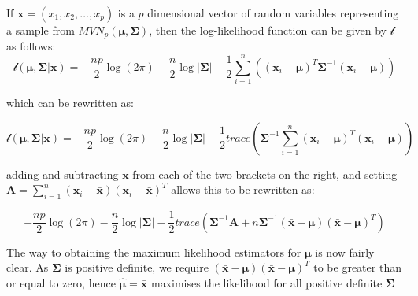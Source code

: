 \begin{theorem}
\label{th:mvnlike}

If $\boldsymbol{x} = (x_{1}, x_{2}, \ldots, x_{p})$ is a $p$ dimensional vector of random variables representing a sample from $MVN_{p}(\boldsymbol{\mu}, \boldsymbol{\Sigma})$, then the log-likelihood function can be given by $\mathscr{l}$ as follows:
\begin{equation}
\label{eq:mvnlike}
\mathscr{l}(\boldsymbol{\mu}, \boldsymbol{\Sigma}| \boldsymbol{x}) = 
- \frac{np}{2} \log(2 \pi) - \frac{n}{2} \log \lvert \boldsymbol{\Sigma} \rvert -
\frac{1}{2} \sum_{i=1}^{n} \left( (\boldsymbol{x}_{i} - \boldsymbol{\mu})^{T} \boldsymbol{\Sigma}^{-1}(\boldsymbol{x}_{i} - \boldsymbol{\mu}) \right)
\end{equation}

which can be rewritten as:

\begin{displaymath}
\label{eq:mvnlike}
\mathscr{l}(\boldsymbol{\mu}, \boldsymbol{\Sigma}| \boldsymbol{x}) = 
- \frac{np}{2} \log(2 \pi) - \frac{n}{2} \log \lvert \boldsymbol{\Sigma} \rvert -
\frac{1}{2} trace \left( \boldsymbol{\Sigma}^{-1} \sum_{i=1}^{n} (\boldsymbol{x}_{i} - \boldsymbol{\mu})^{T}(\boldsymbol{x}_{i} - \boldsymbol{\mu}) \right)
\end{displaymath}

adding and subtracting $\bar{\boldsymbol{x}}$ from each of the two brackets on the right, and setting $\boldsymbol{A} = \sum_{i=1}^{n}(\boldsymbol{x}_{i} - \bar{\boldsymbol{x}})(\boldsymbol{x}_{i} - \bar{\boldsymbol{x}})^{T}$ allows this to be rewritten as: 

\begin{displaymath}
\label{eq:mvnlike}
- \frac{np}{2} \log(2 \pi) - \frac{n}{2} \log \lvert \boldsymbol{\Sigma} \rvert -
\frac{1}{2} trace \left( \boldsymbol{\Sigma}^{-1} \boldsymbol{A} + n \boldsymbol{\Sigma}^{-1} (\bar{\boldsymbol{x}} - \boldsymbol{\mu})(\bar{\boldsymbol{x}} - \boldsymbol{\mu})^{T} \right)
\end{displaymath}

The way to obtaining the maximum likelihood estimators for $\boldsymbol{\mu}$ is now fairly clear.   As $\boldsymbol{\Sigma}$ is positive definite, we require $(\bar{\boldsymbol{x}} - \boldsymbol{\mu})(\bar{\boldsymbol{x}} - \boldsymbol{\mu})^{T}$ to be greater than or equal to zero, hence $ \hat{\boldsymbol{\mu}} = \bar{\boldsymbol{x}}$ maximises the likelihood for all positive definite $\boldsymbol{\Sigma}$


\end{theorem}
